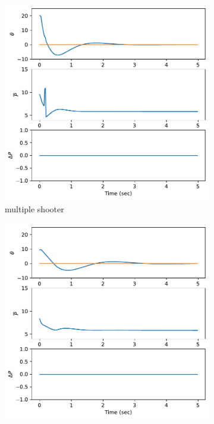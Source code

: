 \documentclass[]{article}
\begin{document}
\begin{figure}[H]
	\centering
	\begin{subfigure}[b]{0.3\textwidth}
	\centering
	\includegraphics[width=\textwidth]{figures/controly115dx6.pdf}
	\caption{multiple shooter}
\end{subfigure}
	\begin{subfigure}[b]{0.3\textwidth}
		\centering
		\includegraphics[width=\textwidth]{figures/controly115dx4.pdf}

\end{subfigure}
\end{figure}
\end{document}
